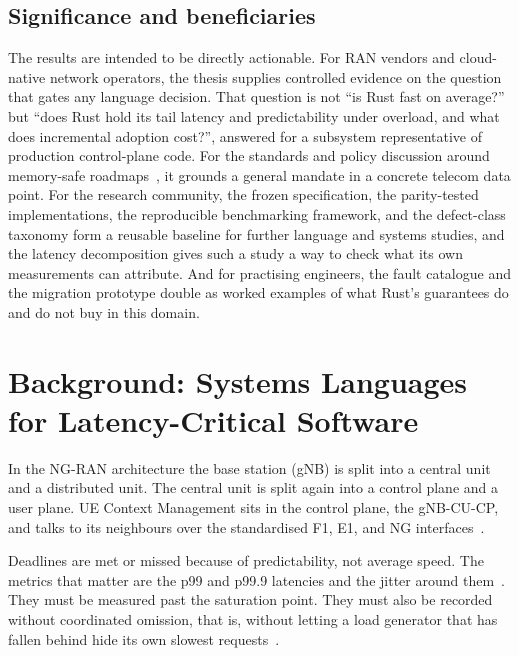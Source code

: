 \documentclass[english,twoside,openright,a4paper,censored,csm,software-track-2020]{HYthesisML}
\begin{document}
\section{Significance and beneficiaries}
The results are intended to be directly actionable. For RAN vendors and cloud-native network
operators, the thesis supplies controlled evidence on the question that gates any language
decision. That question is not ``is Rust fast on average?'' but ``does Rust hold its tail latency and
predictability under overload, and what does incremental adoption cost?'', answered for a subsystem
representative of production control-plane code. For the standards and policy discussion around
memory-safe roadmaps~\cite{cisa2023memorysafe,oncd2024building}, it grounds a general mandate in
a concrete telecom data point. For the research community, the frozen specification, the
parity-tested implementations, the reproducible benchmarking framework, and the defect-class
taxonomy form a reusable baseline for further language and systems studies, and the latency
decomposition gives such a study a way to check what its own measurements can attribute. And for practising
engineers, the fault catalogue and the migration prototype double as worked examples of what
Rust's guarantees do and do not buy in this domain.

\chapter{Background: Systems Languages for Latency-Critical Software\label{chapter:background}}

In the NG-RAN architecture the base station (gNB) is split into a central unit and a
distributed unit. The central unit is split again into a control plane and a user plane.
UE Context Management sits in the control plane, the gNB-CU-CP, and talks to its
neighbours over the standardised F1, E1, and NG interfaces~\cite{3gpp38401}.

Deadlines are met or missed because of predictability, not average speed. The metrics
that matter are the p99 and p99.9 latencies and the jitter around
them~\cite{dean2013tail}. They must be measured past the saturation point. They must also
be recorded without coordinated omission, that is, without letting a load generator that
has fallen behind hide its own slowest
requests~\cite{schroeder2006openclosed,tene_hdrhistogram}.
\end{document}
